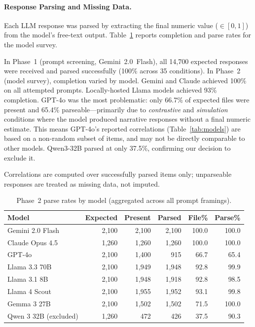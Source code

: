 
\paragraph{Response Parsing and Missing Data.}
Each LLM response was parsed by extracting the final numeric value ($\in [0,1]$) from the model's free-text output. Table~\ref{tab:parse-rates} reports completion and parse rates for the model survey.

In Phase~1 (prompt screening, Gemini~2.0~Flash), all 14{,}700 expected responses were received and parsed successfully (100\% across 35 conditions). In Phase~2 (model survey), completion varied by model. Gemini and Claude achieved 100\% on all attempted prompts. Locally-hosted Llama models achieved 93\% completion. GPT-4o was the most problematic: only 66.7\% of expected files were present and 65.4\% parseable---primarily due to \emph{contrastive} and \emph{simulation} conditions where the model produced narrative responses without a final numeric estimate. This means GPT-4o's reported correlations (Table~\ref{tab:models}) are based on a non-random subset of items, and may not be directly comparable to other models. Qwen3-32B parsed at only 37.5\%, confirming our decision to exclude it.

Correlations are computed over successfully parsed items only; unparseable responses are treated as missing data, not imputed.

\begin{table}[t]
\centering
\caption{Phase~2 parse rates by model (aggregated across all prompt framings).}\label{tab:parse-rates}
\small
\begin{tabular}{lrrrrr}
\toprule
\textbf{Model} & \textbf{Expected} & \textbf{Present} & \textbf{Parsed} & \textbf{File\%} & \textbf{Parse\%} \\
\midrule
Gemini 2.0 Flash      & 2{,}100 & 2{,}100 & 2{,}100 & 100.0 & 100.0 \\
Claude Opus 4.5       & 1{,}260 & 1{,}260 & 1{,}260 & 100.0 & 100.0 \\
GPT-4o                & 2{,}100 & 1{,}400 &    915  &  66.7 &  65.4 \\
Llama 3.3 70B         & 2{,}100 & 1{,}949 & 1{,}948 &  92.8 &  99.9 \\
Llama 3.1 8B          & 2{,}100 & 1{,}948 & 1{,}918 &  92.8 &  98.5 \\
Llama 4 Scout         & 2{,}100 & 1{,}955 & 1{,}952 &  93.1 &  99.8 \\
Gemma 3 27B           & 2{,}100 & 1{,}502 & 1{,}502 &  71.5 & 100.0 \\
Qwen 3 32B (excluded) & 1{,}260 &    472  &    426  &  37.5 &  90.3 \\
\bottomrule
\end{tabular}
\end{table}
